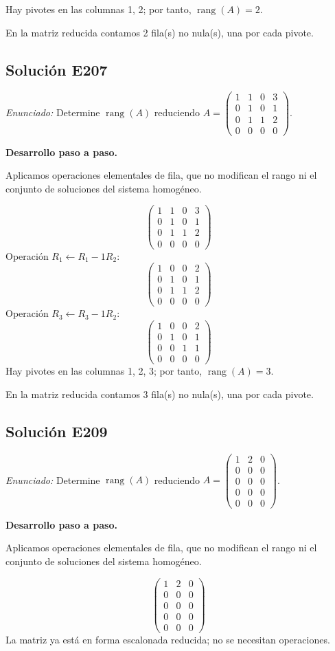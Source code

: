 \documentclass[12pt]{article}
\theoremstyle{remark}
\newcommand{\rang}{\operatorname{rang}}
\newcommand{\solucion}[2]{\Needspace{11\baselineskip}\subsection*{Solución E#1}\noindent\textit{Enunciado:} #2\par\medskip\noindent\textbf{Desarrollo paso a paso.}\par\medskip}
\begin{document}
Hay pivotes en las columnas 1, 2; por tanto, $\boxed{\rang(A)=2}$.

En la matriz reducida contamos 2 fila(s) no nula(s), una por cada pivote.


\medskip

\solucion{207}{Determine $\rang(A)$ reduciendo $A=\begin{pmatrix}1&1&0&3\\0&1&0&1\\0&1&1&2\\0&0&0&0\end{pmatrix}$.}
Aplicamos operaciones elementales de fila, que no modifican el rango ni el conjunto de soluciones del sistema homogéneo.

\[
\begin{pmatrix}1&1&0&3\\0&1&0&1\\0&1&1&2\\0&0&0&0\end{pmatrix}
\]
Operación $R_{1}\leftarrow R_{1}-1R_{2}$:
\[
\begin{pmatrix}1&0&0&2\\0&1&0&1\\0&1&1&2\\0&0&0&0\end{pmatrix}
\]
Operación $R_{3}\leftarrow R_{3}-1R_{2}$:
\[
\begin{pmatrix}1&0&0&2\\0&1&0&1\\0&0&1&1\\0&0&0&0\end{pmatrix}
\]
Hay pivotes en las columnas 1, 2, 3; por tanto, $\boxed{\rang(A)=3}$.

En la matriz reducida contamos 3 fila(s) no nula(s), una por cada pivote.


\medskip

\solucion{209}{Determine $\rang(A)$ reduciendo $A=\begin{pmatrix}1&2&0\\0&0&0\\0&0&0\\0&0&0\\0&0&0\end{pmatrix}$.}
Aplicamos operaciones elementales de fila, que no modifican el rango ni el conjunto de soluciones del sistema homogéneo.

\[
\begin{pmatrix}1&2&0\\0&0&0\\0&0&0\\0&0&0\\0&0&0\end{pmatrix}
\]
La matriz ya está en forma escalonada reducida; no se necesitan operaciones.
\end{document}
